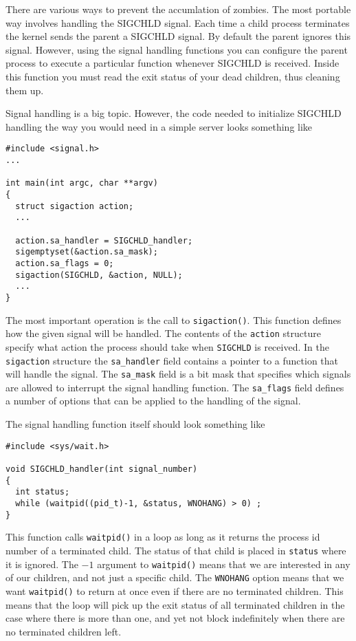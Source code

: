 \documentclass{article}
\begin{document}
There are various ways to prevent the accumlation of zombies. The most portable way involves handling the SIGCHLD signal. Each time a child process terminates the kernel sends the parent a SIGCHLD signal. By default the parent ignores this signal. However, using the signal handling functions you can configure the parent process to execute a particular function whenever SIGCHLD is received. Inside this function you must read the exit status of your dead children, thus cleaning them up.

Signal handling is a big topic. However, the code needed to initialize SIGCHLD handling the way you would need in a simple server looks something like

\begin{verbatim}
#include <signal.h>
...

int main(int argc, char **argv)
{
  struct sigaction action;
  ...
  
  action.sa_handler = SIGCHLD_handler;
  sigemptyset(&action.sa_mask);
  action.sa_flags = 0;
  sigaction(SIGCHLD, &action, NULL);
  ...
}
\end{verbatim}

The most important operation is the call to \texttt{sigaction()}. This function defines how the given signal will be handled. The contents of the \texttt{action} structure specify what action the process should take when \texttt{SIGCHLD} is received. In the \texttt{sigaction} structure the \texttt{sa\_handler} field contains a pointer to a function that will handle the signal. The \texttt{sa\_mask} field is a bit mask that specifies which signals are allowed to interrupt the signal handling function. The \texttt{sa\_flags} field defines a number of options that can be applied to the handling of the signal.

The signal handling function itself should look something like

\begin{verbatim}
#include <sys/wait.h>

void SIGCHLD_handler(int signal_number)
{
  int status;
  while (waitpid((pid_t)-1, &status, WNOHANG) > 0) ;
}
\end{verbatim}

This function calls \texttt{waitpid()} in a loop as long as it returns the process id number of a terminated child. The status of that child is placed in \texttt{status} where it is ignored. The $-1$ argument to \texttt{waitpid()} means that we are interested in any of our children, and not just a specific child. The \texttt{WNOHANG} option means that we want \texttt{waitpid()} to return at once even if there are no terminated children. This means that the loop will pick up the exit status of all terminated children in the case where there is more than one, and yet not block indefinitely when there are no terminated children left.
\end{document}
